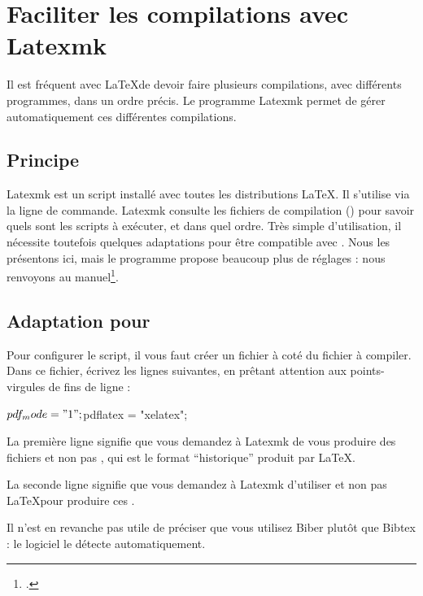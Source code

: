 \chapter{Faciliter les compilations avec Latexmk}\label{latexmk}

\begin{intro}
Il est fréquent avec \LaTeX de devoir faire plusieurs compilations, avec différents programmes, dans un ordre précis. Le programme Latexmk permet de gérer automatiquement ces différentes compilations.
\end{intro}

\section{Principe}

Latexmk est un script installé avec toutes les distributions \LaTeX. Il s'utilise via la ligne de commande.
Latexmk consulte les fichiers de compilation () pour savoir quels sont les scripts à exécuter, et dans quel ordre. 
Très simple d'utilisation, il nécessite toutefois quelques adaptations pour être compatible avec \XeLaTeX. Nous les présentons ici, mais le programme propose beaucoup plus de réglages : nous renvoyons au manuel\footcite{latexmk}.

\section[Adaptation pour XeLaTeX]{Adaptation pour \XeLaTeX}

Pour configurer le script, il vous faut créer un fichier  à coté du fichier à compiler. Dans ce fichier, écrivez les lignes suivantes, en prêtant attention aux points-virgules de fins de ligne  :

\begin{bashcode}
$pdf_mode = "1";
$pdflatex = "xelatex";
\end{bashcode}

La première ligne signifie que vous demandez à Latexmk de vous produire des fichiers  et non pas , qui est le format \enquote{historique} produit par \LaTeX.

La seconde ligne signifie que vous demandez à Latexmk d'utiliser \XeLaTeX et non pas \LaTeX pour produire ces .

Il n'est en revanche pas utile de préciser que vous utilisez Biber plutôt que Bibtex : le logiciel le détecte automatiquement.

